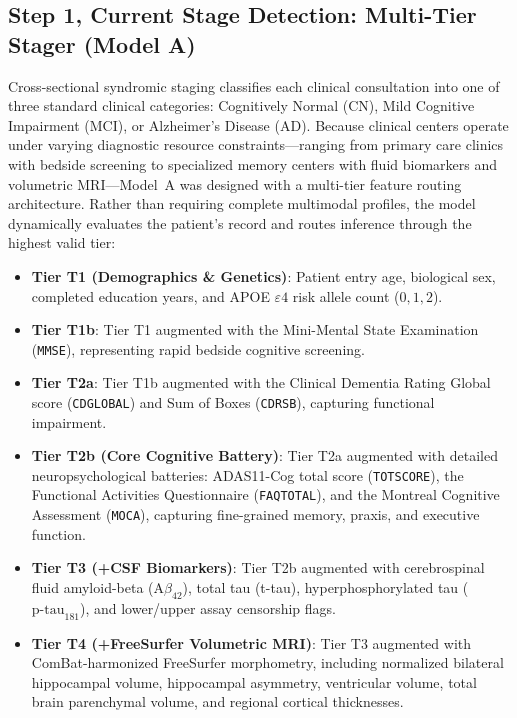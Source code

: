 \subsection{Step 1, Current Stage Detection: Multi-Tier Stager (Model A)}
Cross-sectional syndromic staging classifies each clinical consultation into one of three standard clinical categories: Cognitively Normal (CN), Mild Cognitive Impairment (MCI), or Alzheimer's Disease (AD). Because clinical centers operate under varying diagnostic resource constraints—ranging from primary care clinics with bedside screening to specialized memory centers with fluid biomarkers and volumetric MRI—Model~A was designed with a multi-tier feature routing architecture. Rather than requiring complete multimodal profiles, the model dynamically evaluates the patient's record and routes inference through the highest valid tier:
\begin{itemize}
    \item \textbf{Tier T1 (Demographics \& Genetics)}: Patient entry age, biological sex, completed education years, and APOE $\varepsilon4$ risk allele count ($0, 1, 2$).
    \item \textbf{Tier T1b}: Tier T1 augmented with the Mini-Mental State Examination (\texttt{MMSE}), representing rapid bedside cognitive screening.
    \item \textbf{Tier T2a}: Tier T1b augmented with the Clinical Dementia Rating Global score (\texttt{CDGLOBAL}) and Sum of Boxes (\texttt{CDRSB}), capturing functional impairment.
    \item \textbf{Tier T2b (Core Cognitive Battery)}: Tier T2a augmented with detailed neuropsychological batteries: ADAS11-Cog total score (\texttt{TOTSCORE}), the Functional Activities Questionnaire (\texttt{FAQTOTAL}), and the Montreal Cognitive Assessment (\texttt{MOCA}), capturing fine-grained memory, praxis, and executive function.
    \item \textbf{Tier T3 (+CSF Biomarkers)}: Tier T2b augmented with cerebrospinal fluid amyloid-beta ($\text{A}\beta_{42}$), total tau (t-tau), hyperphosphorylated tau ($\text{p-tau}_{181}$), and lower/upper assay censorship flags.
    \item \textbf{Tier T4 (+FreeSurfer Volumetric MRI)}: Tier T3 augmented with ComBat-harmonized FreeSurfer morphometry, including normalized bilateral hippocampal volume, hippocampal asymmetry, ventricular volume, total brain parenchymal volume, and regional cortical thicknesses.
\end{itemize}

